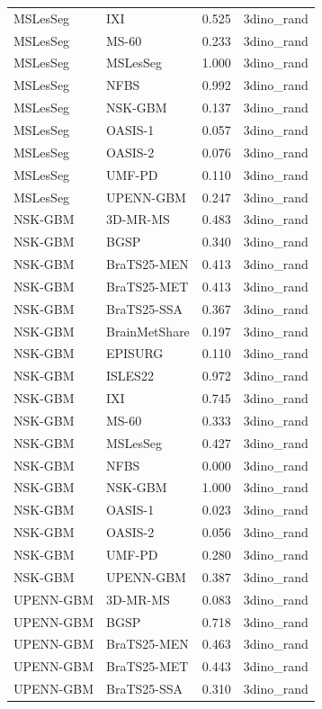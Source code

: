 \begin{tabular}{llrl}
MSLesSeg & IXI & 0.525 & 3dino\_rand \\
MSLesSeg & MS-60 & 0.233 & 3dino\_rand \\
MSLesSeg & MSLesSeg & 1.000 & 3dino\_rand \\
MSLesSeg & NFBS & 0.992 & 3dino\_rand \\
MSLesSeg & NSK-GBM & 0.137 & 3dino\_rand \\
MSLesSeg & OASIS-1 & 0.057 & 3dino\_rand \\
MSLesSeg & OASIS-2 & 0.076 & 3dino\_rand \\
MSLesSeg & UMF-PD & 0.110 & 3dino\_rand \\
MSLesSeg & UPENN-GBM & 0.247 & 3dino\_rand \\
NSK-GBM & 3D-MR-MS & 0.483 & 3dino\_rand \\
NSK-GBM & BGSP & 0.340 & 3dino\_rand \\
NSK-GBM & BraTS25-MEN & 0.413 & 3dino\_rand \\
NSK-GBM & BraTS25-MET & 0.413 & 3dino\_rand \\
NSK-GBM & BraTS25-SSA & 0.367 & 3dino\_rand \\
NSK-GBM & BrainMetShare & 0.197 & 3dino\_rand \\
NSK-GBM & EPISURG & 0.110 & 3dino\_rand \\
NSK-GBM & ISLES22 & 0.972 & 3dino\_rand \\
NSK-GBM & IXI & 0.745 & 3dino\_rand \\
NSK-GBM & MS-60 & 0.333 & 3dino\_rand \\
NSK-GBM & MSLesSeg & 0.427 & 3dino\_rand \\
NSK-GBM & NFBS & 0.000 & 3dino\_rand \\
NSK-GBM & NSK-GBM & 1.000 & 3dino\_rand \\
NSK-GBM & OASIS-1 & 0.023 & 3dino\_rand \\
NSK-GBM & OASIS-2 & 0.056 & 3dino\_rand \\
NSK-GBM & UMF-PD & 0.280 & 3dino\_rand \\
NSK-GBM & UPENN-GBM & 0.387 & 3dino\_rand \\
UPENN-GBM & 3D-MR-MS & 0.083 & 3dino\_rand \\
UPENN-GBM & BGSP & 0.718 & 3dino\_rand \\
UPENN-GBM & BraTS25-MEN & 0.463 & 3dino\_rand \\
UPENN-GBM & BraTS25-MET & 0.443 & 3dino\_rand \\
UPENN-GBM & BraTS25-SSA & 0.310 & 3dino\_rand \\

\end{tabular}
